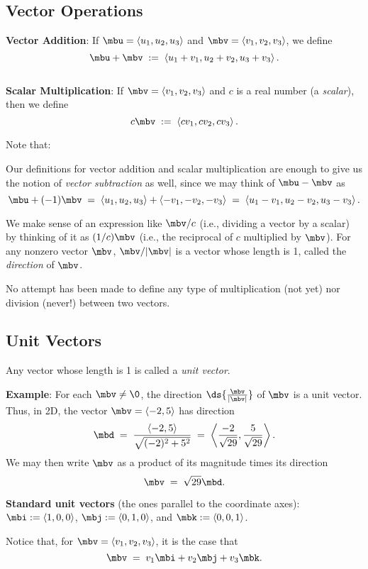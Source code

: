\documentclass[12pt,fleqn]{article}
\def\eg#1{{\bf Example}: #1}
\def\newt{\vspace{0.2in}\ni}
\begin{document}
\subsection*{Vector Operations}

{\bf Vector Addition}: If $\mbu = \left<u_1, u_2, u_3\right>$
and $\mbv = \left<v_1, v_2, v_3\right>$, we define
$$ \mbu + \mbv \;:=\; \left<u_1 + v_1, u_2 + v_2, u_3 + v_3\right>. $$\\
{\bf Scalar Multiplication}: If $\mbv = \left<v_1, v_2, v_3\right>$
and $c$ is a real number (a {\em scalar}), then we define
$$ c\mbv \;:=\; \left<cv_1, cv_2, cv_3\right>. $$

\np
\ni
Note that:
\bi
\item
  Our definitions for vector addition and scalar multiplication
  are enough to give us the notion of {\em vector subtraction} as
  well, since we may think of $\mbu - \mbv$ as
  $$ \mbu + (-1)\mbv \;=\; \left<u_1, u_2, u_3\right> +
	\left<-v_1, -v_2, -v_3\right> \;=\; \left<u_1 - v_1,
	u_2 - v_2, u_3 - v_3\right>. $$
\item
  We make sense of an expression like $\mbv/c$ (i.e., dividing
  a vector by a scalar) by thinking of it as $(1/c)\mbv$
  (i.e., the reciprocal of $c$ multiplied by $\mbv$).  For
  any nonzero vector $\mbv$, $\mbv/|\mbv|$ is a vector whose
  length is 1, called the {\em direction} of $\mbv$.
\item
  No attempt has been made to define any type of multiplication
  (not yet) nor division (never!) between two vectors.
\ei

\subsection*{Unit Vectors}

Any vector whose length is 1 is called a {\em unit vector}.

\newt
\eg{}
For each $\mbv \ne \0$, the direction $\ds{\frac{\mbv}{|\mbv|}}$
of $\mbv$ is a unit vector.  Thus, in 2D, the vector
$\mbv = \left<-2, 5\right>$ has direction
$$ \mbd \;=\; \frac{\left<-2,5\right>}{\sqrt{(-2)^2 + 5^2}} \;=\;
	\left<\frac{-2}{\sqrt{29}}, \frac{5}{\sqrt{29}}\right>. $$
We may then write $\mbv$ as a product of its magnitude times its
direction
$$ \mbv \;=\; \sqrt{29} \mbd. $$

\newt
{\bf Standard unit vectors} (the ones parallel to the
coordinate axes): $\mbi := \left<1,0,0\right>$,
$\mbj := \left<0,1,0\right>$, and $\mbk := \left<0,0,1\right>$.

\newt
Notice that, for $\mbv = \left<v_1, v_2, v_3\right>$, it is the
case that
$$ \mbv \;=\; v_1 \mbi + v_2 \mbj + v_3 \mbk. $$
\end{document}
